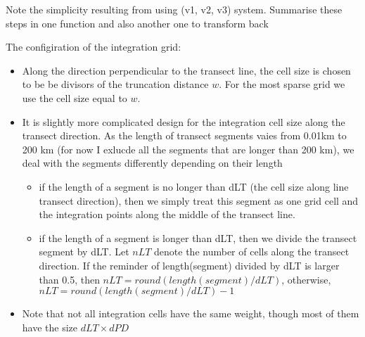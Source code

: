 \documentclass[a4paper]{article}\usepackage[]{graphicx}\usepackage[]{color}
\newcommand{\bi}{\begin{itemize}}
\newcommand{\ei}{\end{itemize}}
\begin{document}
Note the simplicity resulting from using (v1, v2, v3) system. Summarise these steps in one function and also another one to transform back 



The configiration of the integration grid: 
\bi 
\item Along the direction perpendicular to the transect line, the cell size is chosen to be be divisors of the truncation distance $w$. For the most sparse grid we use the cell size equal to $w$.
\item It is slightly more complicated design for the integration cell size along the transect direction. As the length of transect segments vaies from 0.01km to 200 km (for now I exlucde all the segments that are longer than 200 km), we deal with the segments differently depending on their length 
\bi 
\item if the length of a segment is no longer than dLT (the cell size along line transect direction), then we simply treat this segment as one grid cell and the integration points along the middle of the transect line. 
\item if the length of a segment is longer than dLT, then we divide the transect segment by dLT. Let $nLT$ denote the number of cells along the transect direction. If the reminder of length(segment) divided by dLT is larger than 0.5, then $nLT = round(length(segment)/dLT)$, otherwise,  $nLT = round(length(segment)/dLT)-1$
\ei 
\item Note that not all integration cells have the same weight, though most of them have the size $dLT\times dPD$
\ei 
\end{document}
